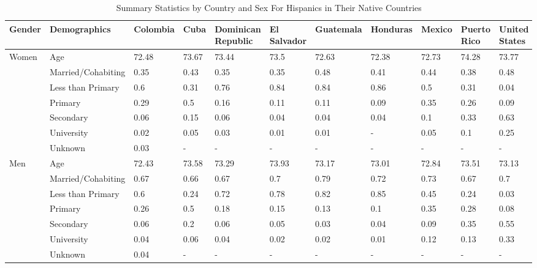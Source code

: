 \begin{table}[ht]
\centering
\caption{Summary Statistics by Country and Sex For Hispanics in Their Native Countries} 
\label{table1}
\begingroup\small
\begin{tabular}{l|l|lllllllll}
  \hline
Gender & Demographics & Colombia & Cuba & Dominican Republic & El Salvador & Guatemala & Honduras & Mexico & Puerto Rico & United States \\ 
  \hline
Women & Age & 72.48 & 73.67 & 73.44 & 73.5 & 72.63 & 72.38 & 72.73 & 74.28 & 73.77 \\ 
   & Married/Cohabiting & 0.35 & 0.43 & 0.35 & 0.35 & 0.48 & 0.41 & 0.44 & 0.38 & 0.48 \\ 
   & Less than Primary & 0.6 & 0.31 & 0.76 & 0.84 & 0.84 & 0.86 & 0.5 & 0.31 & 0.04 \\ 
   & Primary & 0.29 & 0.5 & 0.16 & 0.11 & 0.11 & 0.09 & 0.35 & 0.26 & 0.09 \\ 
   & Secondary & 0.06 & 0.15 & 0.06 & 0.04 & 0.04 & 0.04 & 0.1 & 0.33 & 0.63 \\ 
   & University & 0.02 & 0.05 & 0.03 & 0.01 & 0.01 & - & 0.05 & 0.1 & 0.25 \\ 
   & Unknown & 0.03 & - & - & - & - & - & - & - & - \\ 
  Men & Age & 72.43 & 73.58 & 73.29 & 73.93 & 73.17 & 73.01 & 72.84 & 73.51 & 73.13 \\ 
   & Married/Cohabiting & 0.67 & 0.66 & 0.67 & 0.7 & 0.79 & 0.72 & 0.73 & 0.67 & 0.7 \\ 
   & Less than Primary & 0.6 & 0.24 & 0.72 & 0.78 & 0.82 & 0.85 & 0.45 & 0.24 & 0.03 \\ 
   & Primary & 0.26 & 0.5 & 0.18 & 0.15 & 0.13 & 0.1 & 0.35 & 0.28 & 0.08 \\ 
   & Secondary & 0.06 & 0.2 & 0.06 & 0.05 & 0.03 & 0.04 & 0.09 & 0.35 & 0.55 \\ 
   & University & 0.04 & 0.06 & 0.04 & 0.02 & 0.02 & 0.01 & 0.12 & 0.13 & 0.33 \\ 
   & Unknown & 0.04 & - & - & - & - & - & - & - & - \\ 
   \hline
\end{tabular}
\endgroup
\end{table}
